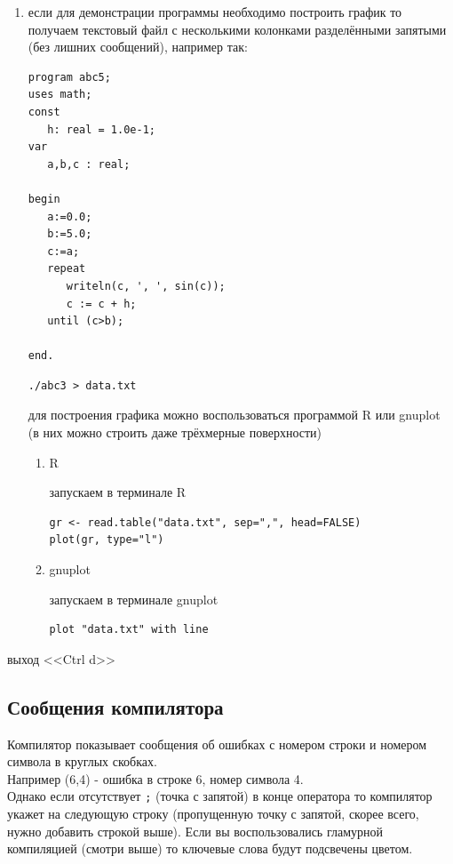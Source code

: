 \documentclass[unicode, 12pt, a4paper,oneside,fleqn]{article}
\begin{document}
\begin{enumerate}
\item если для демонстрации программы необходимо построить график то
  получаем текстовый файл с несколькими колонками разделёнными
  запятыми (без лишних сообщений), например так:
{\tiny
\begin{verbatim}
program abc5;
uses math;
const
   h: real = 1.0e-1;
var 
   a,b,c : real;

begin
   a:=0.0;
   b:=5.0;
   c:=a;
   repeat
      writeln(c, ', ', sin(c));
      c := c + h;
   until (c>b);
   
end.
\end{verbatim}
}
\begin{verbatim}
./abc3 > data.txt
\end{verbatim}

  
  для построения графика можно воспользоваться программой R или
  gnuplot (в них можно строить даже трёхмерные поверхности)
  \begin{enumerate}
  \item R
    
    запускаем в терминале R
\begin{verbatim}
gr <- read.table("data.txt", sep=",", head=FALSE)
plot(gr, type="l")
\end{verbatim}
  \item gnuplot
    
    запускаем в терминале gnuplot
\begin{verbatim}
plot "data.txt" with line
\end{verbatim}
  \end{enumerate}
\end{enumerate}

выход <<Ctrl d>>




\subsection{Сообщения компилятора}

Компилятор показывает сообщения об ошибках с номером строки и номером
символа в круглых скобках.\\
Например (6,4) - ошибка в строке 6, номер символа 4.\\
Однако если отсутствует \verb!;! (точка с запятой) в конце оператора
то компилятор укажет на следующую строку (пропущенную точку с запятой,
скорее всего, нужно добавить строкой выше). Если вы воспользовались
гламурной компиляцией (смотри выше) то ключевые слова будут подсвечены
цветом. 
 
\end{document}
